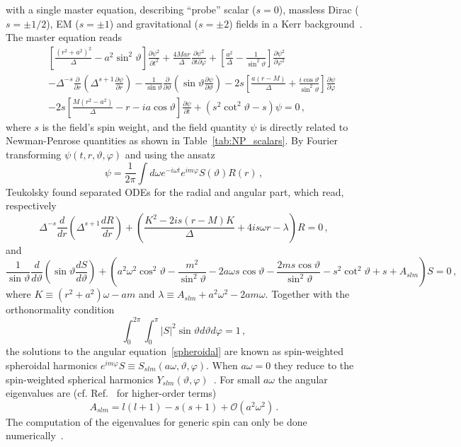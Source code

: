 \documentclass[11pt]{article}
\newcommand{\be}{\begin{equation}}
\newcommand{\ee}{\end{equation}}
\newcommand{\bea}{\begin{eqnarray}}
\newcommand{\eea}{\end{eqnarray}}
\newcommand{\nn}{\nonumber}
\numberwithin{equation}{section} %
\begin{document}
with a single master equation, describing ``probe'' scalar ($s=0$), massless Dirac ($s=\pm 1/2$), EM ($s=\pm 1$) and 
gravitational ($s=\pm 2$) fields in a Kerr background~\cite{Teukolsky:1972my}. The master equation reads
%
\bea
&&\left[\frac{\left(r^2+a^2\right)^2}{\Delta}-a^2\sin^2\vartheta\right]\frac{\partial\psi^2}{\partial t^2}+\frac{4Mar}{\Delta}\frac{\partial\psi^2}{\partial t\partial\varphi}+
\left[\frac{a^2}{\Delta}-\frac{1}{\sin^2\vartheta}\right]\frac{\partial\psi^2}{\partial\varphi^2}\nn\\
&&-\Delta^{-s}\frac{\partial}{\partial r}\left(\Delta^{s+1} \frac{\partial \psi}{\partial r}\right)-\frac{1}{\sin\vartheta}\frac{\partial}{\partial \vartheta}\left(\sin\vartheta\frac{\partial\psi}{\partial \vartheta}\right)-2s\left[\frac{a(r-M)}{\Delta}+\frac{i\cos\vartheta}{\sin^2\vartheta}\right]\frac{\partial\psi}{\partial\varphi}\nn\\
&&-2s\left[\frac{M(r^2-a^2)}{\Delta}-r-ia\cos\vartheta\right]\frac{\partial\psi}{\partial t}+\left(s^2\cot^2\vartheta-s\right)\psi=0\,,
\eea
%
where $s$ is the field's spin weight, and the field quantity $\psi$ is directly related to Newman-Penrose quantities as shown in Table~\ref{tab:NP_scalars}.
By Fourier transforming $\psi(t,r,\vartheta,\varphi)$ and using the ansatz
%
\be\label{teu_eigen}
\psi=\frac{1}{2\pi}\int d\omega e^{-i\omega t}e^{im\varphi}S(\vartheta)R(r)\,,
\ee
%
Teukolsky found separated ODEs for the radial and angular part, which read, respectively
%
\be\label{teu_radial}
\Delta^{-s}\frac{d}{dr}\left(\Delta^{s+1}\frac{dR}{dr}\right)+\left(\frac{K^2-2is(r-M)K}{\Delta}+4is\omega r-\lambda\right)R=0\,,
\ee
%
and
%
{\small
\be
\frac{1}{\sin\vartheta}\frac{d}{d\vartheta}\left(\sin\vartheta\frac{dS}{d\vartheta}\right)+
\left(a^2\omega^2\cos^2\vartheta-\frac{m^2}{\sin^2\vartheta}-2a\omega s\cos\vartheta
-\frac{2m s\cos\vartheta}{\sin^2\vartheta}-s^2\cot^2\vartheta+s+A_{slm}\right)S=0\,, \label{spheroidal}
\ee}
%
where $K\equiv (r^2+a^2)\omega-am$ and $\lambda\equiv A_{slm}+a^2\omega^2-2am\omega$. Together with the orthonormality condition
%
\be\label{sphe_norm}
\int_0^{2\pi}\int_0^{\pi}|S|^2\sin\vartheta d\vartheta d\varphi=1\,,
\ee
%
the solutions to the angular equation~\eqref{spheroidal} are known as spin-weighted spheroidal harmonics $e^{im\varphi}S\equiv S_{slm}(a\omega,\vartheta,\varphi)$. When $a\omega=0$ they reduce to the spin-weighted spherical harmonics $Y_{slm}(\vartheta,\varphi)$~\cite{Goldberg1967}.
For small $a\omega$ the angular eigenvalues are (cf. Ref.~\cite{Berti:2005gp} for higher-order terms)
%
\be
A_{slm}=l(l+1)-s(s+1)+\mathcal{O}(a^2\omega^2)\,.
\ee
%
The computation of the eigenvalues for generic spin can only be done numerically~\cite{Berti:2005gp}. 
\end{document}
